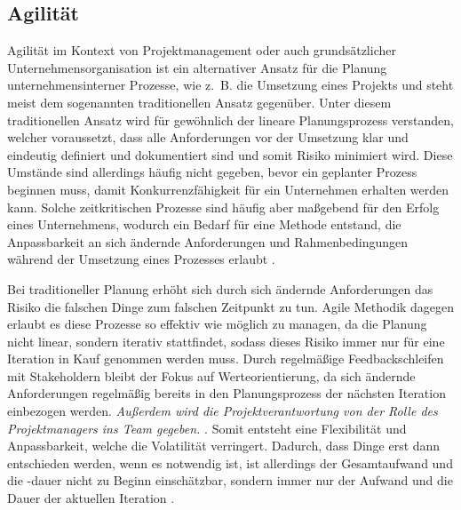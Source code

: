 \subsection{Agilität}
Agilität im Kontext von Projektmanagement oder auch grundsätzlicher Unternehmensorganisation ist ein alternativer Ansatz für die Planung unternehmensinterner Prozesse, wie z. B. die Umsetzung eines Projekts und steht meist dem sogenannten traditionellen Ansatz gegenüber. Unter diesem traditionellen Ansatz wird für gewöhnlich der lineare Planungsprozess verstanden, welcher voraussetzt, dass alle Anforderungen vor der Umsetzung klar und eindeutig definiert und dokumentiert sind und somit Risiko minimiert wird. Diese Umstände sind allerdings häufig nicht gegeben, bevor ein geplanter Prozess beginnen muss, damit Konkurrenzfähigkeit für ein Unternehmen erhalten werden kann. Solche zeitkritischen Prozesse sind häufig aber maßgebend für den Erfolg eines Unternehmens, wodurch ein Bedarf für eine Methode entstand, die Anpassbarkeit an sich ändernde Anforderungen und Rahmenbedingungen während der Umsetzung eines Prozesses erlaubt \cite{agilismVsTranditionalApproaches}.

Bei traditioneller Planung erhöht sich durch sich ändernde Anforderungen das Risiko die falschen Dinge zum falschen Zeitpunkt zu tun. Agile Methodik  dagegen erlaubt es diese Prozesse so effektiv wie möglich zu managen, da die Planung nicht linear, sondern iterativ stattfindet, sodass dieses Risiko immer nur für eine Iteration in Kauf genommen werden muss. Durch regelmäßige Feedbackschleifen mit Stakeholdern bleibt der Fokus auf Werteorientierung, da sich ändernde Anforderungen regelmäßig bereits in den Planungsprozess der nächsten Iteration einbezogen werden. \emph{Außerdem wird die Projektverantwortung von der Rolle des Projektmanagers ins Team gegeben.} \cite{TheRoleofProjectManagerinAgileSoftwareTeams}.
Somit entsteht eine Flexibilität und Anpassbarkeit, welche die Volatilität verringert. Dadurch, dass Dinge erst dann entschieden werden, wenn es notwendig ist, ist allerdings der Gesamtaufwand und die -dauer nicht zu Beginn einschätzbar, sondern immer nur der Aufwand und die Dauer der aktuellen Iteration \cite{agilismVsTranditionalApproaches}.

